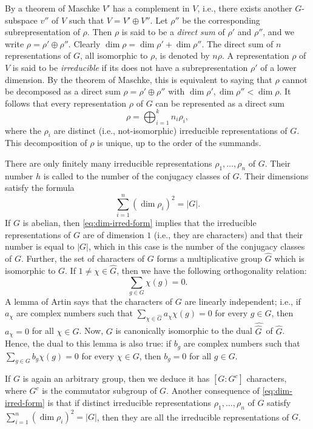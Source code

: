 \documentclass[../main.tex]{subfiles}
\begin{document}
By a theorem of Maschke $V'$ has a complement in $V$, i.e., there exists another $G$-subspace $v''$ of $V$ such that $V=V'\oplus V''$. Let $\rho''$ be the corresponding subrepresentation of $\rho$. Then $\rho$ is said to be a \textit{direct sum} of $\rho'$ and $\rho''$, and we write $\rho=\rho'\oplus\rho''$. Clearly $\dim\rho=\dim\rho'+\dim\rho''$. The direct sum of $n$ representations of $G$, all isomorphic to $\rho$, is denoted by $n\rho$. A representation $\rho$ of $V$ is said to be \textit{irreducible} if its does not have a subrepresentation $\rho'$ of a lower dimension. By the theorem of Maschke, this is equivalent to saying that $\rho$ cannot be decomposed as a direct sum $\rho=\rho'\oplus\rho''$ with $\dim\rho',\dim\rho''<\dim\rho$. It follows that every representation $\rho$ of $G$ can be represented as a direct sum
\[\rho=\bigoplus_{i=1}^kn_i\rho_i,\]
where the $\rho_i$ are distinct (i.e., not-isomorphic) irreducible representations of $G$. This decomposition of $\rho$ is unique, up to the order of the summands.

There are only finitely many irreducible representations $\rho_1,\ldots,\rho_n$ of $G$. Their number $h$ is called to the number of the conjugacy classes of $G$. Their dimensions satisfy the formula
\begin{equation}
	\sum_{i=1}^n(\dim\rho_i)^2=|G|. \label{eq:dim-irred-form}
\end{equation}
If $G$ is abelian, then \eqref{eq:dim-irred-form} implies that the irreducible representations of $G$ are of dimension $1$ (i.e., they are characters) and that their number is equal to $|G|$, which in this case is the number of the conjugacy classes of $G$. Further, the set of characters of $G$ forms a multiplicative group $\widehat G$ which is isomorphic to $G$. If $1\ne\chi\in\widehat G$, then we have the following orthogonality relation:
\[\sum_{g\in G}\chi(g)=0.\]
A lemma of Artin says that the characters of $G$ are linearly independent; i.e., if $a_\chi$ are complex numbers such that $\sum_{\chi\in\widehat G}a_\chi\chi(g)=0$ for every $g\in G$, then $a_\chi=0$ for all $\chi\in G$. Now, $G$ is canonically isomorphic to the dual $\widehat{\widehat G\,}$ of $\widehat G$. Hence, the dual to this lemma is also true: if $b_g$ are complex numbers such that $\sum_{g\in G}b_g\chi(g)=0$ for every $\chi\in G$, then $b_g=0$ for all $g\in G$.

If $G$ is again an arbitrary group, then we deduce it has $[G:G^c]$ characters, where $G^c$ is the commutator subgroup of $G$. Another consequence of \eqref{eq:dim-irred-form} is that if distinct irreducible representations $\rho_1,\ldots,\rho_n$ of $G$ satisfy $\sum_{i=1}^n(\dim\rho_i)^2=|G|$, then they are all the irreducible representations of $G$.
\end{document}
